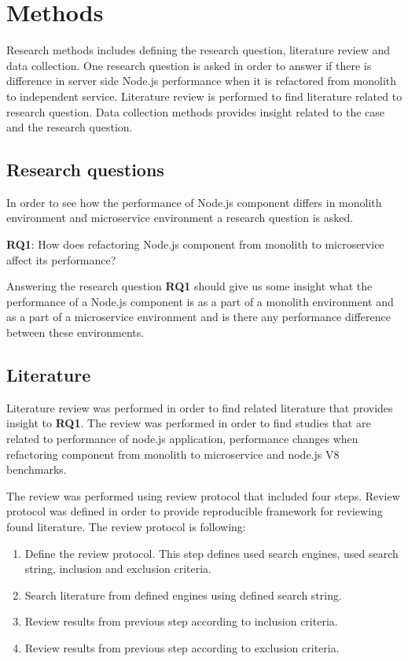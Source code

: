 \chapter{Methods\label{methods}}
Research methods includes defining the research question, literature review and data collection.
One research question is asked in order to answer if there is difference in server side Node.js performance when it is refactored from monolith to independent service.
Literature review is performed to find literature related to research question.
Data collection methods provides insight related to the case and the research question.

\section{Research questions}
In order to see how the performance of Node.js component differs in monolith environment and microservice environment a research question is asked.

\textbf{RQ1}: How does refactoring Node.js component from monolith to microservice affect its performance?

Answering the research question \textbf{RQ1} should give us some insight what the performance of a Node.js component is as a part of a monolith environment and as a part of a microservice environment and is there any performance difference between these environments.

\section{Literature}
Literature review was performed in order to find related literature that provides insight to \textbf{RQ1}.
The review was performed in order to find studies that are related to performance of node.js application, performance changes when refactoring component from monolith to microservice and node.js V8 benchmarks.

The review was performed using review protocol that included four steps.
Review protocol was defined in order to provide reproducible framework for reviewing found literature.
The review protocol is following:
\begin{enumerate}
    \item Define the review protocol. This step defines used search engines, used search string, inclusion and exclusion criteria.
    \item Search literature from defined engines using defined search string.
    \item Review results from previous step according to inclusion criteria.
    \item Review results from previous step according to exclusion criteria.
\end{enumerate}

